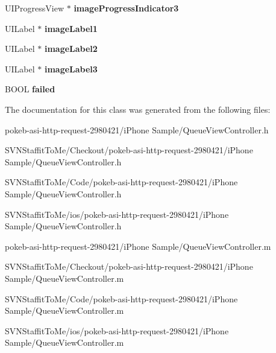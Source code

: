 \begin{DoxyCompactItemize}
\item 
\hypertarget{interface_queue_view_controller_a93671564efbe77d9711e83278b9c882e}{
\-U\-I\-Progress\-View $\ast$ {\bfseries image\-Progress\-Indicator3}}
\label{interface_queue_view_controller_a93671564efbe77d9711e83278b9c882e}

\item 
\hypertarget{interface_queue_view_controller_aa6abb6e71d9d200b4f49171c20fa0e98}{
\-U\-I\-Label $\ast$ {\bfseries image\-Label1}}
\label{interface_queue_view_controller_aa6abb6e71d9d200b4f49171c20fa0e98}

\item 
\hypertarget{interface_queue_view_controller_a919c5925f006058b90c5a1f1f6d6601a}{
\-U\-I\-Label $\ast$ {\bfseries image\-Label2}}
\label{interface_queue_view_controller_a919c5925f006058b90c5a1f1f6d6601a}

\item 
\hypertarget{interface_queue_view_controller_adb08ea8201f3017dde2ec430312ec838}{
\-U\-I\-Label $\ast$ {\bfseries image\-Label3}}
\label{interface_queue_view_controller_adb08ea8201f3017dde2ec430312ec838}

\item 
\hypertarget{interface_queue_view_controller_a1f096be659f7f9f42ca10c793a701dc8}{
\-B\-O\-O\-L {\bfseries failed}}
\label{interface_queue_view_controller_a1f096be659f7f9f42ca10c793a701dc8}

\end{DoxyCompactItemize}


\-The documentation for this class was generated from the following files\-:\begin{DoxyCompactItemize}
\item 
pokeb-\/asi-\/http-\/request-\/2980421/i\-Phone Sample/\-Queue\-View\-Controller.\-h\item 
\-S\-V\-N\-Staffit\-To\-Me/\-Checkout/pokeb-\/asi-\/http-\/request-\/2980421/i\-Phone Sample/\-Queue\-View\-Controller.\-h\item 
\-S\-V\-N\-Staffit\-To\-Me/\-Code/pokeb-\/asi-\/http-\/request-\/2980421/i\-Phone Sample/\-Queue\-View\-Controller.\-h\item 
\-S\-V\-N\-Staffit\-To\-Me/ios/pokeb-\/asi-\/http-\/request-\/2980421/i\-Phone Sample/\-Queue\-View\-Controller.\-h\item 
pokeb-\/asi-\/http-\/request-\/2980421/i\-Phone Sample/\-Queue\-View\-Controller.\-m\item 
\-S\-V\-N\-Staffit\-To\-Me/\-Checkout/pokeb-\/asi-\/http-\/request-\/2980421/i\-Phone Sample/\-Queue\-View\-Controller.\-m\item 
\-S\-V\-N\-Staffit\-To\-Me/\-Code/pokeb-\/asi-\/http-\/request-\/2980421/i\-Phone Sample/\-Queue\-View\-Controller.\-m\item 
\-S\-V\-N\-Staffit\-To\-Me/ios/pokeb-\/asi-\/http-\/request-\/2980421/i\-Phone Sample/\-Queue\-View\-Controller.\-m\end{DoxyCompactItemize}

